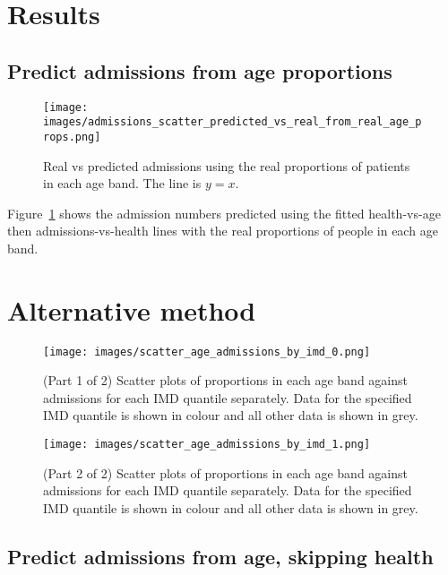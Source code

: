 \documentclass[12pt]{extarticle}
\begin{document}
\section{Results}

\subsection{Predict admissions from age proportions}

\begin{figure}
    \centering
    \texttt{[image: images/admissions\_scatter\_predicted\_vs\_real\_from\_real\_age\_props.png]}
    \caption{Real vs predicted admissions using the real proportions of patients in each age band. The line is $y=x$.}
    \label{fig:admissions_predicted_from_real_age_props}
\end{figure}

Figure~\ref{fig:admissions_predicted_from_real_age_props} shows the admission numbers predicted using the fitted health-vs-age then admissions-vs-health lines with the real proportions of people in each age band.


\section{Alternative method}


\begin{figure}[!b]
    \centering
    \texttt{[image: images/scatter\_age\_admissions\_by\_imd\_0.png]}
    \caption{(Part 1 of 2) Scatter plots of proportions in each age band against admissions for each IMD quantile separately. Data for the specified IMD quantile is shown in colour and all other data is shown in grey.}
\end{figure}

\begin{figure}[ht]\ContinuedFloat  %
    \centering
    \texttt{[image: images/scatter\_age\_admissions\_by\_imd\_1.png]}
    \caption{(Part 2 of 2) Scatter plots of proportions in each age band against admissions for each IMD quantile separately. Data for the specified IMD quantile is shown in colour and all other data is shown in grey.}
    \label{fig:data_age_admissions_by_imd}
\end{figure}
\clearpage

\subsection{Predict admissions from age, skipping health}
\end{document}
